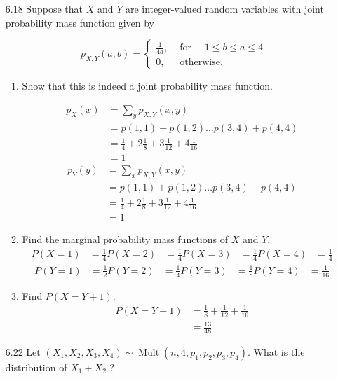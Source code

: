 \documentclass[10pt]{article}
\begin{document}
\begin{itemize}
\newpage
	\item[6.18] Suppose that $X$ and $Y$ are integer-valued random variables with joint probability mass function given by

\[
p_{X, Y}(a, b)= \begin{cases}\frac{1}{4 a}, & \text { for } \quad 1 \leq b \leq a \leq 4 \\ 0, & \text { otherwise. }\end{cases}
\]
	\begin{enumerate}
		\item  Show that this is indeed a joint probability mass function.

			\begin{align*}
				p_X(x) &= \sum^{}_{y}p_{X,Y}(x,y)  \\
					&= p(1,1) + p(1,2) \dots p(3,4) + p(4,4)\\
					&= \frac{1}{4} + 2 \frac{1}{8} + 3\frac{1}{12} + 4 \frac{1}{16} \\
					&= 1
			\end{align*}
			\begin{align*}
				p_Y(y) &= \sum^{}_{x}p_{X,Y}(x,y)  \\
					&= p(1,1) + p(1,2) \dots p(3,4) + p(4,4)\\
					&= \frac{1}{4} + 2 \frac{1}{8} + 3\frac{1}{12} + 4 \frac{1}{16} \\
					&= 1
			\end{align*}
		\item  Find the marginal probability mass functions of $X$ and $Y$.
			\begin{align*}
				P(X=1) &= \frac{1}{4} 
				P(X=2) &= \frac{1}{4} 
				P(X=3) &= \frac{1}{4} 
				P(X=4) &= \frac{1}{4} 
			\end{align*}
			\begin{align*}
				P(Y=1) &= \frac{1}{2} 
				P(Y=2) &= \frac{1}{4} 
				P(Y=3) &= \frac{1}{8} 
				P(Y=4) &= \frac{1}{16} 
			\end{align*}

		\item  Find $P(X=Y+1)$.
				\begin{align*}
					P(X=Y+1) &= \frac{1}{8} +\frac{1}{12} +\frac{1}{16}\\
							&= \frac{13}{48} 
				\end{align*}
	\end{enumerate}

\newpage
	\item[6.22] Let $\left(X_{1}, X_{2}, X_{3}, X_{4}\right) \sim \operatorname{Mult}\left(n, 4, p_{1}, p_{2}, p_{3}, p_{4}\right)$. What is the distribution of $X_{1}+X_{2}$ ?


\end{itemize}
\end{document}
